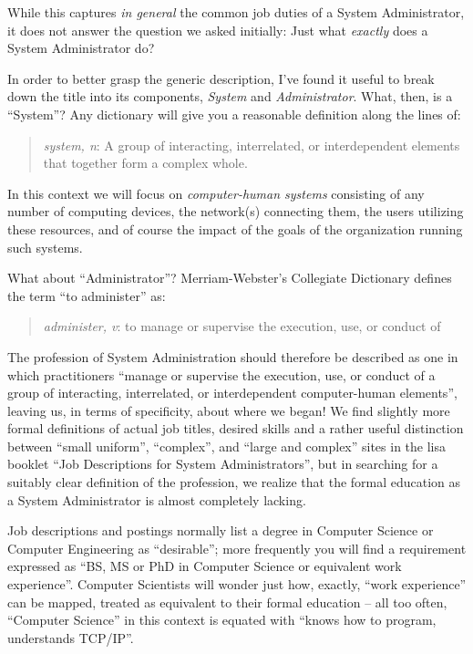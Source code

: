 While this captures {\em in general} the common job
duties of a System Administrator, it does not answer
the question we asked initially: Just what {\em
exactly} does a System Administrator do?

In order to better grasp the generic description, I've
found it useful to break down the title into its
components, {\em System} and {\em Administrator}.
What, then, is a ``System''?  Any dictionary will give
you a reasonable definition along the lines of:

\begin{quote}
{\em system, n}: A group of interacting, interrelated,
or interdependent elements that together form a
complex whole.
\end{quote}

In this context we will focus on {\em computer-human
systems}\cite{intro:burgess-analytical} consisting of
any number of computing devices, the network(s)
connecting them, the users utilizing these resources,
and of course the impact of the goals of the
organization running such systems.

What about ``Administrator''?  Merriam-Webster's
Collegiate Dictionary defines the term ``to
administer'' as:

\begin{quote}
{\em administer, v}: to manage or supervise the
execution, use, or conduct of
\end{quote}

The profession
of System Administration should therefore be described
as one in which practitioners ``manage or supervise
the execution, use, or conduct of a group of
interacting, interrelated, or interdependent
computer-human elements'', leaving us, in terms of
specificity, about where we began!  We find slightly
more formal definitions of actual job titles, desired
skills and a rather useful distinction between ``small
uniform'', ``complex'', and ``large and complex''
sites in the \gls{lisa} booklet ``Job Descriptions for
System Administrators''\cite{intro:lisa-jobs}, but in
searching for a suitably clear definition of the
profession, we realize that the formal education as a
System Administrator is almost completely lacking.

Job descriptions and postings normally list a degree
in Computer Science or Computer Engineering as
``desirable''; more frequently you will find a
requirement expressed as ``BS, MS or PhD in Computer
Science or equivalent work experience''.  Computer
Scientists will wonder just how, exactly, ``work
experience'' can be mapped, treated as equivalent to
their formal education -- all too often, ``Computer
Science'' in this context is equated with ``knows how
to program, understands TCP/IP''.

